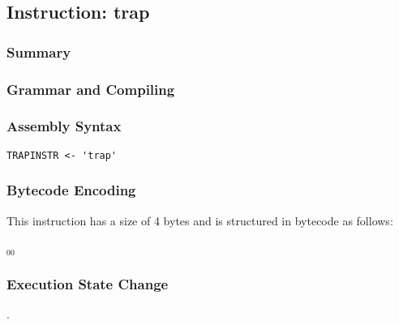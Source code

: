 \subsection{Instruction: trap}

\subsubsection{Summary}


\subsubsection{Grammar and Compiling}


\subsubsection{Assembly Syntax}

\begin{myquote}
\begin{verbatim}
TRAPINSTR <- 'trap'
\end{verbatim}
\end{myquote}


\subsubsection{Bytecode Encoding}

This instruction has a size of 4 bytes and is structured in bytecode as follows:

$_{00}$\ 


\subsubsection{Execution State Change}

.


